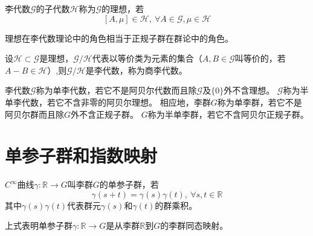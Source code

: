 \begin{definition}
    李代数$\mathscr{G}$的子代数$\mathscr{H}$称为$\mathscr{G}$的理想，若
    $$[A, \mu] \in \mathscr{H}, ~ \forall A \in \mathscr{G}, \mu \in \mathscr{H}$$
\end{definition}

\begin{note}
    理想在李代数理论中的角色相当于正规子群在群论中的角色。
\end{note}

\begin{theorem}
    设$\mathscr{H} \subset \mathscr{G}$是理想，$\mathscr{G} / \mathscr{H}$代表以等价类为元素的集合（$A, B \in \mathscr{G}$叫等价的，若$A - B \in \mathscr{H}$）,则$\mathscr{G} / \mathscr{H}$是李代数，称为商李代数。
\end{theorem}

\begin{definition}
    李代数$\mathscr{G}$称为单李代数，若它不是阿贝尔代数而且除$\mathscr{G}$及$\{0\}$外不含理想。
    $\mathscr{G}$称为半单李代数，若它不含非零的阿贝尔理想。
    相应地，李群$G$称为单李群，若它不是阿贝尔群而且除$G$外不含正规子群。
    $G$称为半单李群，若它不含阿贝尔正规子群。
\end{definition}

\section{单参子群和指数映射}

\begin{definition}
    $C^\infty$曲线$\gamma \colon \mathbb{R} \to G$叫李群$G$的单参子群，若
    $$\gamma(s + t) = \gamma(s)\gamma(t), ~ \forall s, t \in \mathbb{R}$$
    其中$\gamma(s)\gamma(t)$代表群元$\gamma(s)$和$\gamma(t)$的群乘积。
\end{definition}

\begin{note}
    上式表明单参子群$\gamma \colon \mathbb{R} \to G$是从李群$\mathbb{R}$到$G$的李群同态映射。
\end{note}

